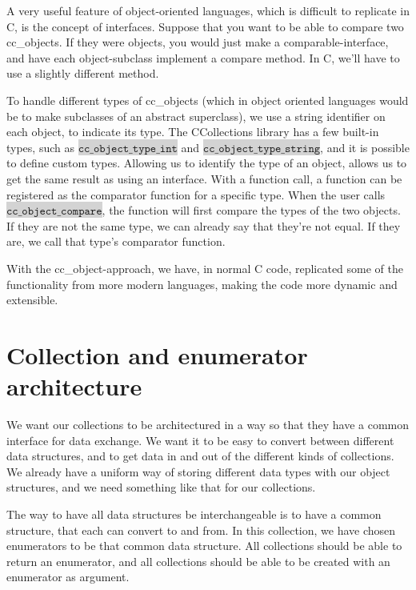 \documentclass[table]{ituthesis}
\newcommand{\highlight}[1]{\colorbox{lightGray}{$\displaystyle \texttt{#1}$}}
\begin{document}
A very useful feature of object-oriented languages, which is difficult to replicate in C, is the concept of interfaces. Suppose that you want to be able to compare two cc\_objects. If they were objects, you would just make a comparable-interface, and have each object-subclass implement a compare method. In C, we'll have to use a slightly different method.

To handle different types of cc\_objects (which in object oriented languages would be to make subclasses of an abstract superclass), we use a string identifier on each object, to indicate its type. The CCollections library has a few built-in types, such as \highlight{cc\_object\_type\_int} and \highlight{cc\_object\_type\_string}, and it is possible to define custom types. Allowing us to identify the type of an object, allows us to get the same result as using an interface. With a function call, a function can be registered as the comparator function for a specific type. When the user calls \highlight{cc\_object\_compare}, the function will first compare the types of the two objects. If they are not the same type, we can already say that they're not equal. If they are, we call that type's comparator function.

With the cc\_object-approach, we have, in normal C code, replicated some of the functionality from more modern languages, making the code more dynamic and extensible.

\section{Collection and enumerator architecture}\label{sec:arch_collections}

We want our collections to be architectured in a way so that they have a common interface for data exchange. We want it to be easy to convert between different data structures, and to get data in and out of the different kinds of collections. We already have a uniform way of storing different data types with our object structures, and we need something like that for our collections.

The way to have all data structures be interchangeable is to have a common structure, that each can convert to and from. In this collection, we have chosen enumerators to be that common data structure. All collections should be able to return an enumerator, and all collections should be able to be created with an enumerator as argument.
\end{document}
